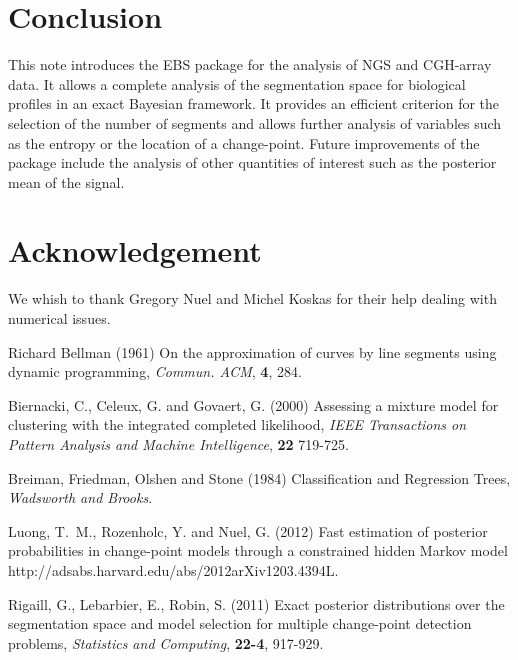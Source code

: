 \documentclass{bioinfo}
\begin{document}
\section{Conclusion}

This note introduces the EBS package for the analysis of NGS and CGH-array data. It allows a complete analysis of the segmentation space for biological profiles in an exact Bayesian framework. 
It provides an efficient criterion for the selection of the number of segments and allows further analysis of variables such as the entropy or the location of a change-point. 
Future improvements of the package include the analysis of other quantities of interest such as the posterior mean of the signal.



\section*{Acknowledgement}
We whish to thank Gregory Nuel and Michel Koskas for their help dealing with numerical issues.


%
%
%
%
%
%
%
%
%


\begin{thebibliography}{}

 Richard Bellman (1961) On the approximation of curves by line segments using dynamic programming,  {\it Commun. {ACM}}, {\bf 4}, 284.

 Biernacki, C., Celeux, G. and Govaert, G. (2000) Assessing a mixture model for clustering with the integrated completed likelihood, {\it{IEEE} Transactions on Pattern Analysis and Machine Intelligence}, {\bf 22} 719-725.

 Breiman, Friedman, Olshen and Stone (1984) Classification and Regression Trees, {\it Wadsworth and Brooks}.

 Luong, T.~M., Rozenholc, Y. and Nuel, G. (2012) Fast estimation of posterior probabilities in change-point models through a constrained hidden Markov model {http://adsabs.harvard.edu/abs/2012arXiv1203.4394L}.

 Rigaill, G., Lebarbier, E., Robin, S. (2011) Exact posterior distributions over the segmentation space and model selection for multiple change-point detection problems, {\it Statistics and Computing}, {\bf 22-4}, 917-929.

\end{thebibliography}
\end{document}
